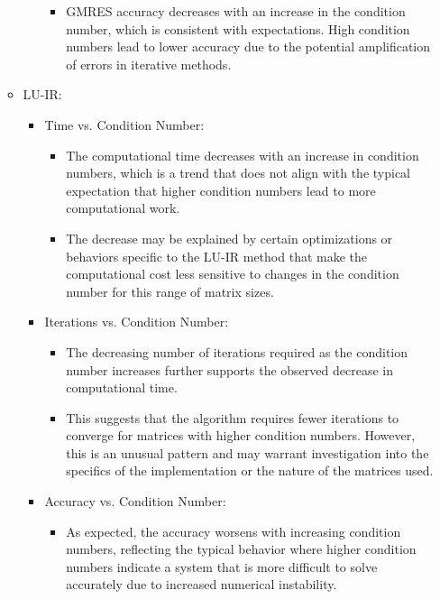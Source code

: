 \begin{enumerate}
\begin{itemize}
\begin{itemize}
            \begin{itemize}
                \item GMRES accuracy decreases with an increase in the condition number, which is consistent with expectations. High condition numbers lead to lower accuracy due to the potential amplification of errors in iterative methods.
            \end{itemize}
        \end{itemize}
        \item LU-IR:
        \begin{itemize}
            \item  Time vs. Condition Number:
            \begin{itemize}
                \item The computational time decreases with an increase in condition numbers, which is a trend that does not align with the typical expectation that higher condition numbers lead to more computational work.
               \item  The decrease may be explained by certain optimizations or behaviors specific to the LU-IR method that make the computational cost less sensitive to changes in the condition number for this range of matrix sizes.
            \end{itemize}
            \item Iterations vs. Condition Number:
            \begin{itemize}
                \item The decreasing number of iterations required as the condition number increases further supports the observed decrease in computational time.
                \item This suggests that the algorithm requires fewer iterations to converge for matrices with higher condition numbers. However, this is an unusual pattern and may warrant investigation into the specifics of the implementation or the nature of the matrices used.
            \end{itemize}
            \item Accuracy vs. Condition Number:
            \begin{itemize}
                \item As expected, the accuracy worsens with increasing condition numbers, reflecting the typical behavior where higher condition numbers indicate a system that is more difficult to solve accurately due to increased numerical instability.
            \end{itemize}

\end{itemize}
\end{itemize}
\end{enumerate}

